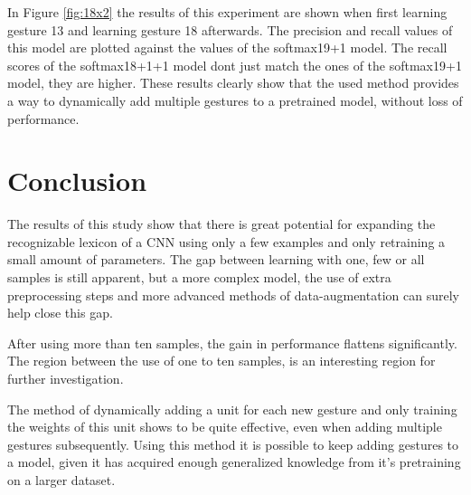 \documentclass[twocolumn]{phdsymp} %
\begin{document}
In Figure \ref{fig:18x2} the results of this experiment are shown when first learning gesture 13 and learning gesture 18 afterwards. The precision and recall values of this model are plotted against the values of the softmax19+1 model. The recall scores of the softmax18+1+1 model dont just match the ones of the softmax19+1 model, they are higher. These results clearly show that the used method provides a way to dynamically add multiple gestures to a pretrained model, without loss of performance.


\section{Conclusion}
The results of this study show that there is great potential for expanding the recognizable lexicon of a CNN using only a few examples and only retraining a small amount of parameters. The gap between learning with one, few or all samples is still apparent, but a more complex model, the use of extra preprocessing steps and more advanced methods of data-augmentation can surely help close this gap.

After using more than ten samples, the gain in performance flattens significantly. The region between the use of one to ten samples, is an interesting region for further investigation.

The method of dynamically adding a unit for each new gesture and only training the weights of this unit shows to be quite effective, even when adding multiple gestures subsequently. Using this method it is possible to keep adding gestures to a model, given it has acquired enough generalized knowledge from it's pretraining on a larger dataset.




\nocite{*}

\end{document}
